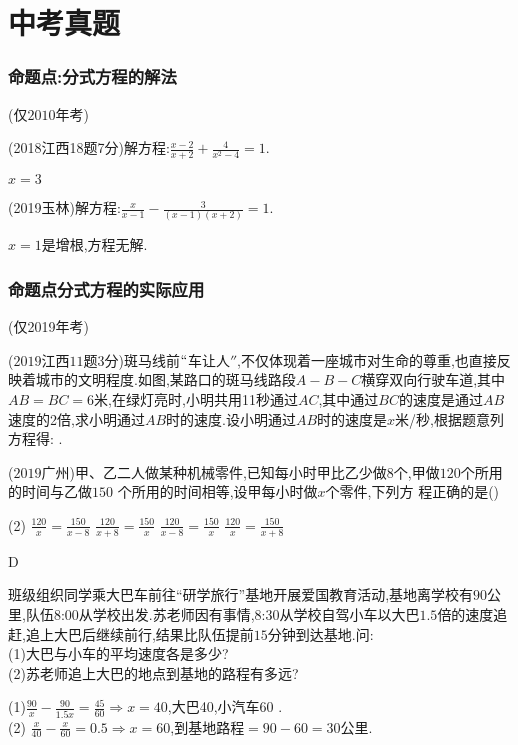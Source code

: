 \documentclass[cn,blue,12pt]{elegantbook}
\renewcommand \tkt[1]{{\CJKunderline[hidden=true, skip=true, thickness=1pt]{#1}}}
\begin{document}
\section{中考真题}%
\label{sec:中考真题}
\subsubsection{命题点:分式方程的解法}(仅\(2010\)年考)%
\begin{zhenti}[resume]
\item (2018江西18题7分)解方程:\(\frac{x-2}{x+2}+\frac{4}{x^2-4}=1.\)
\begin{solution}
        \(x=3\)
\end{solution}
\item (2019玉林)解方程:\(\frac{x}{x-1}-\frac{3}{(x-1)(x+2)}=1.\)
\begin{solution}
        \(x=1\)是增根,方程无解.
\end{solution}
\end{zhenti}

\subsubsection{命题点分式方程的实际应用}(仅2019年考)%

\begin{zhenti}[resume]
\item (\(2019\)江西\(11\)题\(3\)分)斑马线前\(``\)车让人\('' \),不仅体现着一座城市对生命的尊重,也直接反映着城市的文明程度.如图,某路口的斑马线路段\(A-B-C\)横穿双向行驶车道,其中\(AB=BC = 6\)米,在绿灯亮时,小明共用11秒通过\(AC\),其中通过\(BC\)的速度是通过\(AB\)速度的2倍,求小明通过\(AB\)时的速度.设小明通过\(AB\)时的速度是\(x\)米/秒,根据题意列方程得:\tkt{\(\frac{6}{x}+\frac{6}{1.2x}=11\)}  .
\item (\(2019\)广州)甲、乙二人做某种机械零件,已知每小时甲比乙少做\(8\)个,甲做\(120\)个所用的时间与乙做\(150\) 个所用的时间相等,设甲每小时做\(x\)个零件,下列方 程正确的是(\qquad)\\
\begin{tasks}(2)
\task \(\frac{120}{x}=\frac{150}{x-8}\)
\task \(\frac{120}{x+8}=\frac{150}{x}\)
\task \(\frac{120}{x-8}=\frac{150}{x}\)
\task \(\frac{120}{x}=\frac{150}{x+8}\)
\end{tasks}
\begin{solution}
    D
\end{solution}
\item 班级组织同学乘大巴车前往``研学旅行''基地开展爱国教育活动,基地离学校有\(90\)公里,队伍8:00从学校出发.苏老师因有事情,8:30从学校自驾小车以大巴\(1.5\)倍的速度追赶,追上大巴后继续前行,结果比队伍提前\(15\)分钟到达基地.问:\\
(1)大巴与小车的平均速度各是多少?\\
(2)苏老师追上大巴的地点到基地的路程有多远?
\begin{solution}
    (1)\(\frac{90}{x}-\frac{90}{1.5x}=\frac{45}{60} \Rightarrow x=40\),大巴40\kilo\metre\per\hour ,小汽车60 \kilo\metre\per\hour .\\
    (2) \(\frac{x}{40}-\frac{x}{60}=0.5 \Rightarrow x=60\),到基地路程\(=90-60=30\)公里.
\end{solution}
\end{zhenti}
\end{document}
